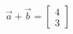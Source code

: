 \documentclass[preview]{standalone}
\begin{document}
\begin{align*}
\vec{a} + \vec{b} = \begin{bmatrix} 4 \\ 3 \end{bmatrix}
\end{align*}
\end{document}
